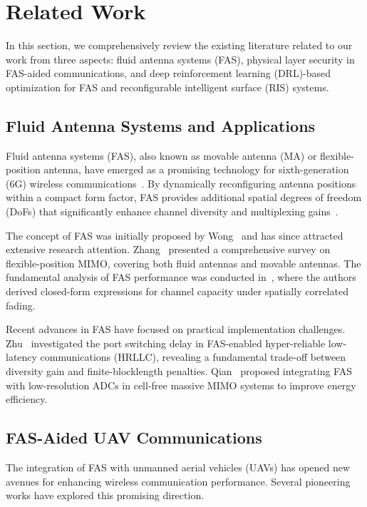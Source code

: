 \section{Related Work}\label{sec:related_work}

In this section, we comprehensively review the existing literature related to our work from three aspects: fluid antenna systems (FAS), physical layer security in FAS-aided communications, and deep reinforcement learning (DRL)-based optimization for FAS and reconfigurable intelligent surface (RIS) systems.

\subsection{Fluid Antenna Systems and Applications}

Fluid antenna systems (FAS), also known as movable antenna (MA) or flexible-position antenna, have emerged as a promising technology for sixth-generation (6G) wireless communications~\cite{wong2021fluid, zhang2023flexible}. By dynamically reconfiguring antenna positions within a compact form factor, FAS provides additional spatial degrees of freedom (DoFs) that significantly enhance channel diversity and multiplexing gains~\cite{cheng20263d}.

The concept of FAS was initially proposed by Wong~\cite{wong2021fluid} and has since attracted extensive research attention. Zhang~\cite{zhang2023flexible} presented a comprehensive survey on flexible-position MIMO, covering both fluid antennas and movable antennas. The fundamental analysis of FAS performance was conducted in~\cite{new2022fundamental}, where the authors derived closed-form expressions for channel capacity under spatially correlated fading.

Recent advances in FAS have focused on practical implementation challenges. Zhu~\cite{zhu2026port} investigated the port switching delay in FAS-enabled hyper-reliable low-latency communications (HRLLC), revealing a fundamental trade-off between diversity gain and finite-blocklength penalties. Qian~\cite{qian2026fas} proposed integrating FAS with low-resolution ADCs in cell-free massive MIMO systems to improve energy efficiency.

\subsection{FAS-Aided UAV Communications}

The integration of FAS with unmanned aerial vehicles (UAVs) has opened new avenues for enhancing wireless communication performance. Several pioneering works have explored this promising direction.

